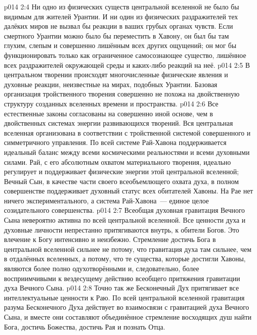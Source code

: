 \vs p014 2:4 Ни одно из физических существ центральной вселенной не было бы видимым для жителей Урантии. И ни один из физических раздражителей тех далёких миров не вызвал бы реакции в ваших грубых органах чувств. Если смертного Урантии можно было бы переместить в Хавону, он был бы там глухим, слепым и совершенно лишённым всех других ощущений; он мог бы функционировать только как ограниченное самосознающее существо, лишённое всех раздражителей окружающей среды и каких\hyp{}либо реакций на неё.
\vs p014 2:5 \pc В центральном творении происходят многочисленные физические явления и духовные реакции, неизвестные на мирах, подобных Урантии. Базовая организация тройственного творения совершенно не похожа на двойственную структуру созданных вселенных времени и пространства.
\vs p014 2:6 Все естественные законы согласованы на совершенно иной основе, чем в двойственных системах энергии развивающихся творений. Вся центральная вселенная организована в соответствии с тройственной системой совершенного и симметричного управления. По всей системе Рай\hyp{}Хавона поддерживается идеальный баланс между всеми космическими реальностями и всеми духовными силами. Рай, с его абсолютным охватом материального творения, идеально регулирует и поддерживает физические энергии этой центральной вселенной; Вечный Сын, в качестве части своего всеобъемлющего охвата духа, в полном совершенстве поддерживает духовный статус всех обитателей Хавоны. На Рае нет ничего экспериментального, а система Рай\hyp{}Хавона~--- единое целое созидательного совершенства.
\vs p014 2:7 Всеобщая духовная гравитация Вечного Сына невероятно активна по всей центральной вселенной. Все ценности духа и духовные личности непрестанно притягиваются внутрь, к обители Богов. Это влечение к Богу интенсивно и неизбежно. Стремление достичь Бога в центральной вселенной сильнее не потому, что гравитация духа там сильнее, чем в отдалённых вселенных, а потому, что те существа, которые достигли Хавоны, являются более полно одухотворёнными и, следовательно, более восприимчивыми к вездесущему действию всеобщего притяжения гравитации духа Вечного Сына.
\vs p014 2:8 Точно так же Бесконечный Дух притягивает все интеллектуальные ценности к Раю. По всей центральной вселенной гравитация разума Бесконечного Духа действует во взаимосвязи с гравитацией духа Вечного Сына, и вместе они составляют объединённое стремление восходящих душ найти Бога, достичь Божества, достичь Рая и познать Отца.
